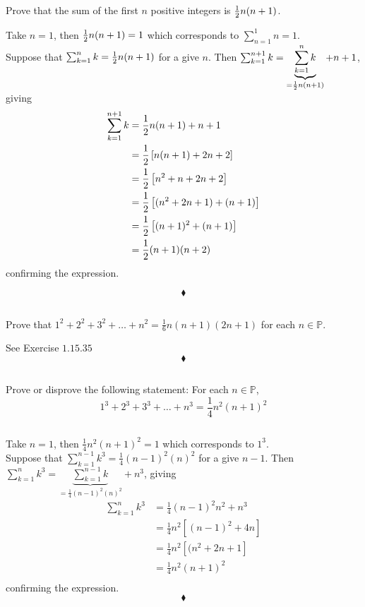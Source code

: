 \subsection{}
\begin{tcolorbox}
Prove that the sum of the first $n$ positive integers is $\frac{1}{2} n(n+1)$. 
\end{tcolorbox}
$$ $$
Take $n=1$, then $\frac{1}{2} n(n+1)= 1$ which corresponds to $\sum_{n=1}^{1}n = 1$.\\
Suppose that $\sum_{k=1}^{n}k = \frac{1}{2} n(n+1)$ for a give $n$. Then $\sum_{k=1}^{n+1}k = \underbrace{\sum_{k=1}^{n}k}_{=\frac{1}{2} n(n+1)}+n+1$, giving \\
\begin{align*}
\sum_{k=1}^{n+1}k &= \frac{1}{2} n(n+1)+n+1\\
&= \frac{1}{2} \left[n(n+1)+2n+2\right]\\
&= \frac{1}{2} \left[n^2+ n+2n+2\right]\\
&= \frac{1}{2} \left[(n^2+2n+1)+(n+1)\right]\\
&= \frac{1}{2} \left[(n+1)^2+(n+1)\right]\\
&= \frac{1}{2} (n+1)(n+2)\\
\end{align*}
confirming the expression.

$$\blacklozenge$$
\subsection{}
\begin{tcolorbox}
Prove that $1^2 + 2^2 +3^2 +\dots + n^2 = \frac{1}{6}n(n + 1)(2n +1)$ for each $n \in  \mathbb{P}$. 
\end{tcolorbox}
$$ $$
See Exercise $\mathbf{1.15.3}5$
$$\blacklozenge$$
\subsection{}
\begin{tcolorbox}
Prove or disprove the following statement: For each $n \in \mathbb{P}$,$$ 1^3 + 2^3 + 3^3 +\dots + n^3 =\frac{1}{4}n^2(n + 1)^2$$
\end{tcolorbox}
$$ $$

Take $n=1$, then $\frac{1}{4}n^2(n + 1)^2= 1$ which corresponds to $1^3$.\\
Suppose that $\sum_{k=1}^{n-1}k^3 = \frac{1}{4}(n-1)^2(n)^2$ for a give $n-1$. Then $\sum_{k=1}^{n}k^3  = \underbrace{\sum_{k=1}^{n-1}k}_{=\frac{1}{4}(n-1)^2(n)^2}+n^3$, giving \\
\begin{align*}
\sum_{k=1}^{n}k^3 &= \frac{1}{4}(n-1)^2n^2+n^3\\
&= \frac{1}{4}n^2\left[(n-1)^2+4n\right]\\
&= \frac{1}{4}n^2\left[(n^2+2n+1\right]\\
&= \frac{1}{4}n^2(n+1)^2\\
\end{align*}
confirming the expression.
$$\blacklozenge$$
